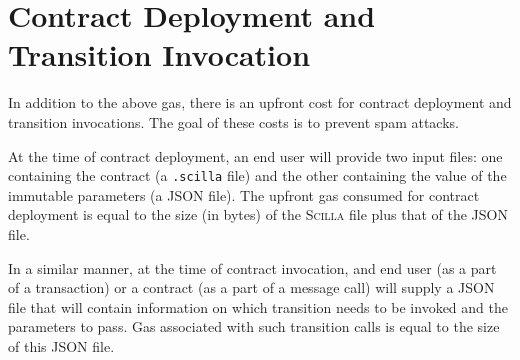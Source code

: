 \documentclass[10pt]{article}
\begin{document}
\section{Contract Deployment and Transition Invocation}

In addition to the above gas, there is an upfront cost for contract deployment and
transition invocations. The goal of these costs is to prevent spam attacks. 

At the time of contract deployment, an end user will provide two input files:
one containing the contract (a \texttt{.scilla} file) and the other containing
the value of the immutable parameters (a JSON file). The upfront gas consumed
for contract deployment is equal to the size (in bytes) of the \textsc{Scilla}
file plus that of the JSON file.  

In a similar manner, at the time of contract invocation, and end user (as a
part of a transaction) or a contract (as a part of a message call)  will supply
a JSON file that will contain information on which transition needs to be
invoked and the parameters to pass. Gas associated with such transition calls
is equal to the size of this JSON file. 

\end{document}
